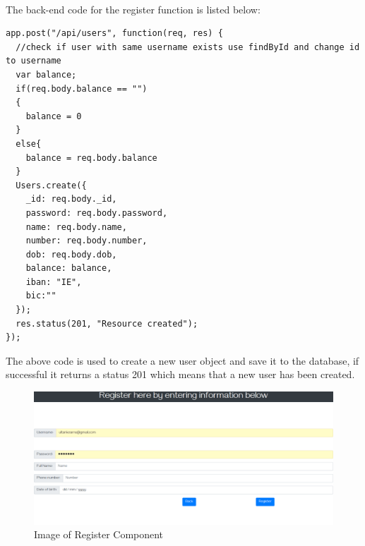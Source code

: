 \\
The back-end code for the register function is listed below:
\begin{verbatim}
app.post("/api/users", function(req, res) {
  //check if user with same username exists use findById and change id to username
  var balance;
  if(req.body.balance == "")
  {
    balance = 0
  }
  else{
    balance = req.body.balance
  }
  Users.create({
    _id: req.body._id,
    password: req.body.password,
    name: req.body.name,
    number: req.body.number,
    dob: req.body.dob,
    balance: balance,
    iban: "IE",
    bic:""
  });
  res.status(201, "Resource created");
});
\end{verbatim}
The above code is used to create a new user object and save it to the database, if successful it returns a status 201 which means that a new user has been created.
\begin{figure}[H]
\includegraphics[width=\textwidth]{img/registercomponent.png}
\caption{Image of Register Component}
\label{fig:Image of register component}
\end{figure}
